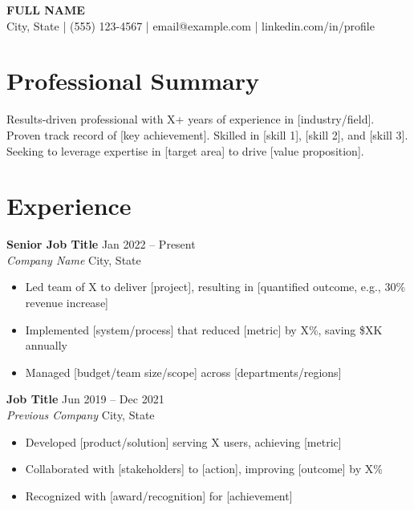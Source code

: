 \documentclass[11pt,a4paper]{article}
\newcommand{\entry}[4]{%
    \noindent\textbf{#1} \hfill #2 \\
    \textit{#3} \hfill #4%
}
\begin{document}
\begin{center}
    {\LARGE\bfseries FULL NAME} \\[0.3em]
    City, State \quad | \quad (555) 123-4567 \quad | \quad email@example.com \quad | \quad linkedin.com/in/profile
\end{center}

\section{Professional Summary}

Results-driven professional with X+ years of experience in [industry/field]. Proven track record of [key achievement]. Skilled in [skill 1], [skill 2], and [skill 3]. Seeking to leverage expertise in [target area] to drive [value proposition].

\section{Experience}

\entry{Senior Job Title}{Jan 2022 -- Present}{Company Name}{City, State}
\begin{itemize}[leftmargin=1.5em, itemsep=0.2em, topsep=0.3em]
    \item Led team of X to deliver [project], resulting in [quantified outcome, e.g., 30\% revenue increase]
    \item Implemented [system/process] that reduced [metric] by X\%, saving \$XK annually
    \item Managed [budget/team size/scope] across [departments/regions]
\end{itemize}

\vspace{0.5em}

\entry{Job Title}{Jun 2019 -- Dec 2021}{Previous Company}{City, State}
\begin{itemize}[leftmargin=1.5em, itemsep=0.2em, topsep=0.3em]
    \item Developed [product/solution] serving X users, achieving [metric]
    \item Collaborated with [stakeholders] to [action], improving [outcome] by X\%
    \item Recognized with [award/recognition] for [achievement]
\end{itemize}

\vspace{0.5em}
\end{document}
